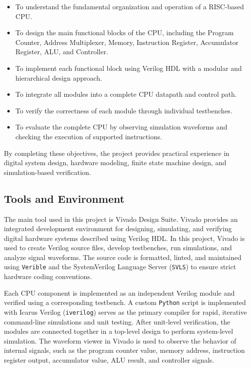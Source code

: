 \begin{itemize}
	\item To understand the fundamental organization and operation of a RISC-based CPU.
	\item To design the main functional blocks of the CPU, including the Program Counter, Address Multiplexer, Memory, Instruction Register, Accumulator Register, ALU, and Controller.
	\item To implement each functional block using Verilog HDL with a modular and hierarchical design approach.
	\item To integrate all modules into a complete CPU datapath and control path.
	\item To verify the correctness of each module through individual testbenches.
	\item To evaluate the complete CPU by observing simulation waveforms and checking the execution of supported instructions.
\end{itemize}

By completing these objectives, the project provides practical experience in digital system design, hardware modeling, finite state machine design, and simulation-based verification.

\subsection{Tools and Environment}

The main tool used in this project is Vivado Design Suite. Vivado provides an integrated development environment for designing, simulating, and verifying digital hardware systems described using Verilog HDL. In this project, Vivado is used to create Verilog source files, develop testbenches, run simulations, and analyze signal waveforms. The source code is formatted, linted, and maintained using \texttt{Verible} and the SystemVerilog Language Server (\texttt{SVLS}) to ensure strict hardware coding conventions.

Each CPU component is implemented as an independent Verilog module and verified using a corresponding testbench. A custom \texttt{Python} script is implemented with Icarus Verilog (\texttt{iverilog}) serves as the primary compiler for rapid, iterative command-line simulations and unit testing. After unit-level verification, the modules are connected together in a top-level design to perform system-level simulation. The waveform viewer in Vivado is used to observe the behavior of internal signals, such as the program counter value, memory address, instruction register output, accumulator value, ALU result, and controller signals.

